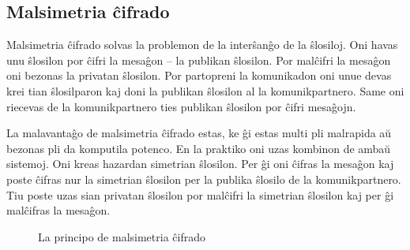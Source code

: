 \documentclass[utf8]{scrartcl}
\begin{document}
\subsection{Malsimetria ĉifrado}

Malsimetria ĉifrado solvas la problemon de la interŝanĝo de la ŝlosiloj. Oni
havas unu ŝlosilon por ĉifri la mesaĝon – la publikan ŝlosilon. Por malĉifri la
mesaĝon oni bezonas la privatan ŝlosilon.  Por partopreni la komunikadon oni
unue devas krei tian ŝlosilparon kaj doni la publikan ŝlosilon al la
komunikpartnero.  Same oni riecevas de la komunikpartnero ties publikan
ŝlosilon por ĉifri mesaĝojn.

La malavantaĝo de malsimetria ĉifrado estas, ke ĝi estas multi pli malrapida aŭ
bezonas pli da komputila potenco.  En la praktiko oni uzas kombinon de ambaŭ
sistemoj. Oni kreas hazardan simetrian ŝlosilon. Per ĝi oni ĉifras la mesaĝon
kaj poste ĉifras nur la simetrian ŝlosilon per la publika ŝlosilo de la
komunikpartnero.  Tiu poste uzas sian privatan ŝlosilon por malĉifri la
simetrian ŝlosilon kaj per ĝi malĉifras la mesaĝon.
%
\begin{figure}













  \caption{La principo de malsimetria ĉifrado}
\end{figure}
\end{document}

